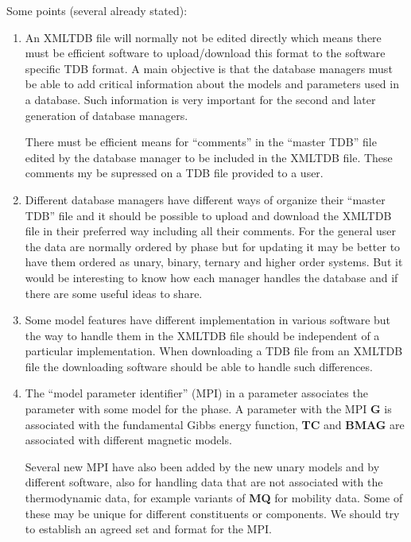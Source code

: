 \documentclass[12pt]{article}
\begin{document}
Some points (several already stated):
\begin{enumerate}
\item An XMLTDB file will normally not be edited directly which means
  there must be efficient software to upload/download this format to
  the software specific TDB format. A main objective is that the
  database managers must be able to add critical information about the
  models and parameters used in a database.  Such information is very
  important for the second and later generation of database managers.

  There must be efficient means for ``comments'' in the ``master TDB''
  file edited by the database manager to be included in the XMLTDB
  file.  These comments my be supressed on a TDB file provided to a
  user.

\item Different database managers have different ways of organize
  their ``master TDB'' file and it should be possible to upload and
  download the XMLTDB file in their preferred way including all their
  comments.  For the general user the data are normally ordered by
  phase but for updating it may be better to have them ordered as
  unary, binary, ternary and higher order systems.  But it would be
  interesting to know how each manager handles the database and if
  there are some useful ideas to share.

\item Some model features have different implementation in various
  software but the way to handle them in the XMLTDB file should be
  independent of a particular implementation.  When downloading a TDB
  file from an XMLTDB file the downloading software should be able to
  handle such differences.
  
\item The ``model parameter identifier'' (MPI) in a parameter
  associates the parameter with some model for the phase.  A parameter
  with the MPI {\bf G} is associated with the fundamental Gibbs
  energy function, {\bf TC} and {\bf BMAG} are associated with
  different magnetic models.

  Several new MPI have also been added by the new unary models and by
  different software, also for handling data that are not associated
  with the thermodynamic data, for example variants of {\bf MQ} for
  mobility data.  Some of these may be unique for different
  constituents or components.  We should try to establish an agreed
  set and format for the MPI.


\end{enumerate}
\end{document}

